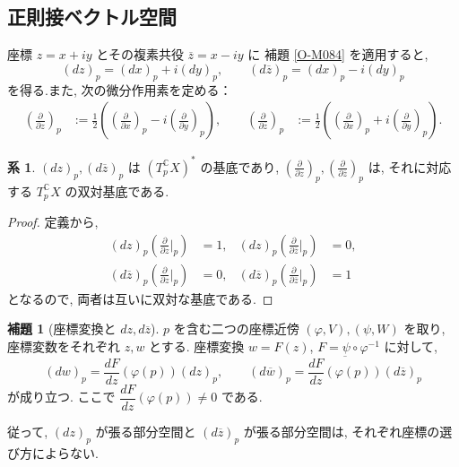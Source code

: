 \documentclass[dvipdfmx,a4paper,11pt]{article} %
\newcommand{\C}{\mathbb{C}}
\theoremstyle{definition}
\numberwithin{equation}{section}
\newtheorem{lem}[thm]{補題}
\newtheorem{cor}[thm]{系}
\begin{document}
\subsection{正則接ベクトル空間}\label{sec-holomorphic-tangent}

座標 $z=x+iy$ とその複素共役 $\overline z=x-iy$ に
補題 \ref{O-M084} を適用すると, 
\[
(dz)_p=(dx)_p+i(dy)_p,\qquad
(d\overline z)_p=(dx)_p-i(dy)_p
\]
を得る.また, 次の微分作用素を定める：
\[
\begin{aligned}
\left(\frac{\partial}{\partial z}\right)_p
&:=\frac12\left(
\left(\frac{\partial}{\partial x}\right)_p
-i\left(\frac{\partial}{\partial y}\right)_p\right),
\qquad
\left(\frac{\partial}{\partial\overline z}\right)_p
&:=\frac12\left(
\left(\frac{\partial}{\partial x}\right)_p
+i\left(\frac{\partial}{\partial y}\right)_p\right).
\end{aligned}
\]

\begin{cor}\label{O-M085}
$(dz)_p,(d\overline z)_p$ は $(T_{p}^{\C}X)^*$ の基底であり, 
\(
\left(\frac{\partial}{\partial z}\right)_p,
\left(\frac{\partial}{\partial\overline z}\right)_p
\)
は, それに対応する $T_{p}^{\C}X$ の双対基底である.
\end{cor}

\begin{proof}
定義から, 
\[
\begin{aligned}
(dz)_p\left(\frac{\partial}{\partial z}\Big|_p\right)&=1,
&
(dz)_p\left(\frac{\partial}{\partial\overline z}\Big|_p\right)&=0,\\
(d\overline z)_p\left(\frac{\partial}{\partial z}\Big|_p\right)&=0,
&
(d\overline z)_p\left(\frac{\partial}{\partial\overline z}\Big|_p\right)&=1
\end{aligned}
\]
となるので, 両者は互いに双対な基底である.
\end{proof}

\begin{lem}[座標変換と $dz,d\overline z$]\label{O-M086}
$p$ を含む二つの座標近傍 $(\varphi,V),(\psi,W)$ を取り,
座標変数をそれぞれ $z,w$ とする.
座標変換 $w=F(z)$, $F=\psi\circ\varphi^{-1}$ に対して,
\[
(dw)_p=\frac{dF}{dz}(\varphi(p))(dz)_p,\qquad
(d\overline w)_p=
\overline{\frac{dF}{dz}(\varphi(p))}(d\overline z)_p
\]
が成り立つ.
ここで $\dfrac{dF}{dz}(\varphi(p))\neq0$ である.

従って, $(dz)_p$ が張る部分空間と
$(d\overline z)_p$ が張る部分空間は,
それぞれ座標の選び方によらない.
\end{lem}
\end{document}

